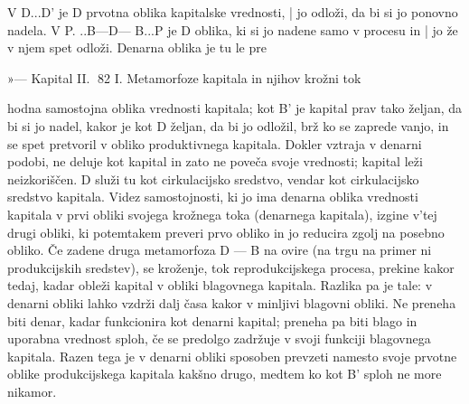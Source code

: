 \documentclass[kapital_02.tex]{subfiles}
\begin{document}
V D...D' je D prvotna oblika kapitalske vrednosti, | jo odloži, da bi si jo ponovno nadela. V P. ..B—D— B...P je D oblika, ki si jo nadene samo v procesu in | jo že v njem spet odloži. Denarna oblika je tu le pre









































































»— Kapital II. 82 I. Metamorfoze kapitala in njihov krožni tok



 hodna samostojna oblika vrednosti kapitala; kot B' je kapital prav tako željan, da bi si jo nadel, kakor je kot D željan, da bi jo odložil, brž ko se zaprede vanjo, in se spet pretvoril v obliko produktivnega kapitala. Dokler vztraja v denarni podobi, ne deluje kot kapital in zato ne poveča svoje vrednosti; kapital leži neizkoriščen. D služi tu kot cirkulacijsko sredstvo, vendar kot cirkulacijsko sredstvo kapitala. Videz samostojnosti, ki jo ima denarna oblika vrednosti kapitala v prvi obliki svojega krožnega toka (denarnega kapitala), izgine v'tej drugi obliki, ki potemtakem preveri prvo obliko in jo reducira zgolj na posebno obliko. Če zadene druga metamorfoza D — B na ovire (na trgu na primer ni produkcijskih sredstev), se kroženje, tok reprodukcijskega procesa, prekine kakor tedaj, kadar obleži kapital v obliki blagovnega kapitala. Razlika pa je tale: v denarni obliki lahko vzdrži dalj časa kakor v minljivi blagovni obliki. Ne preneha biti denar, kadar funkcionira kot denarni kapital; preneha pa biti blago in uporabna vrednost sploh, če se predolgo zadržuje v svoji funkciji blagovnega kapitala. Razen tega je v denarni obliki sposoben prevzeti namesto svoje prvotne oblike produkcijskega kapitala kakšno drugo, medtem ko kot B' sploh ne more nikamor.
\end{document}
